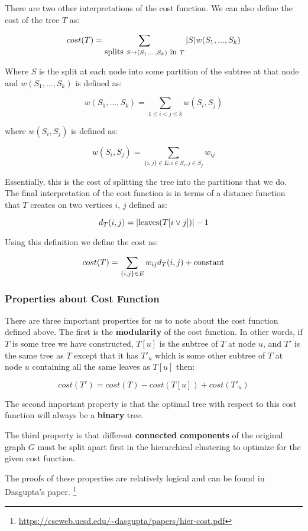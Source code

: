 \documentclass{article}
\begin{document}
There are two other interpretations of the cost function. We can also define the cost of the tree $T$ as:

$$cost(T) = \sum_{\hbox{splits } S \rightarrow (S_1, ..., S_k) \hbox{ in } T} |S| w(S_1, ..., S_k)$$

Where $S$ is the split at each node into some partition of the subtree at that node and $w(S_1, ..., S_k)$ is defined as:

$$w(S_1, ..., S_k) = \sum_{1 \leq i < j \leq k} w(S_i, S_j)$$

where $w(S_i, S_j)$ is defined as:

$$w(S_i, S_j) = \sum_{\{i, j\} \in E: i \in S_i, j \in S_j} w_{ij}$$

Essentially, this is the cost of splitting the tree into the partitions that we do. The final interpretation of the cost function is in terms of a distance function that $T$ creates on two vertices $i$, $j$ defined as:

$$d_T(i, j) = |\hbox{leaves}(T[i \vee j])| - 1$$

Using this definition we define the cost as:

$$cost(T) = \sum_{\{i, j\} \in E}w_{ij}d_T(i, j) + \hbox{constant}$$

\subsubsection{Properties about Cost Function}
There are three important properties for us to note about the cost function defined above. The first is the \textbf{modularity} of the cost function. In other words, if $T$ is some tree we have constructed, $T[u]$ is the subtree of $T$ at node $u$, and $T'$ is the same tree as $T$ except that it has $T'_u$ which is some other subtree of $T$ at node $u$ containing all the same leaves as $T[u]$ then:

$$cost(T') = cost(T) - cost(T[u]) + cost(T'_u)$$

The second important property is that the optimal tree with respect to this cost function will always be a \textbf{binary} tree.

The third property is that different \textbf{connected components} of the original graph $G$ must be split apart first in the hierarchical clustering to optimize for the given cost function.

The proofs of these properties are relatively logical and can be found in Dasgupta's paper. \footnote{\url{https://cseweb.ucsd.edu/~dasgupta/papers/hier-cost.pdf}}
\end{document}
